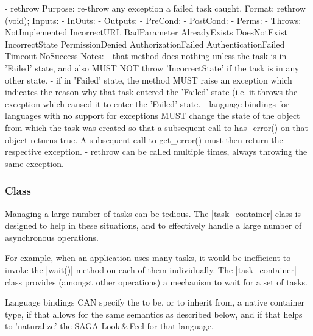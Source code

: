 \begin{myspec}
 
    - rethrow
      Purpose:  re-throw any exception a failed task caught.
      Format:   rethrow (void);
      Inputs:   -
      InOuts:   -
      Outputs:  -
      PreCond:  -
      PostCond: -
      Perms:    -
      Throws:   NotImplemented
                IncorrectURL
                BadParameter
                AlreadyExists
                DoesNotExist
                IncorrectState
                PermissionDenied
                AuthorizationFailed
                AuthenticationFailed
                Timeout
                NoSuccess
      Notes:    - that method does nothing unless the task is in
                  'Failed' state, and also MUST NOT throw 
                  'IncorrectState' if the task is in any other 
                  state.
                - if in 'Failed' state, the method MUST raise an
                  exception which indicates the reason why that
                  task entered the 'Failed' state (i.e. it throws 
                  the exception which caused it to enter the 
                  'Failed' state.
                - language bindings for languages with no
                  support for exceptions MUST change the state
                  of the object from which the task was created
                  so that a subsequent call to has_error() on
                  that object returns true.  A subsequent call to
                  get_error() must then return the respective
                  exception.
                - rethrow can be called multiple times, always
                  throwing the same exception.
 \end{myspec}
 
  \subsubsection*{Class }
 
    Managing a large number of tasks can be tedious.
    The |task_container| class is designed to help in
    these situations, and to effectively handle a large
    number of asynchronous operations.
    
    For example, when an application uses many
     tasks, it would be inefficient to
    invoke the |wait()| method on each of them
    individually.  The |task_container| class provides (amongst
    other operations) a mechanism to wait for a set of
    tasks.
 
    Language bindings CAN specify the  to
    be, or to inherit from, a native container type, if that allows
    for the same semantics as described below, and if that helps to
    'naturalize' the SAGA Look\,\&\,Feel for that language.
 
